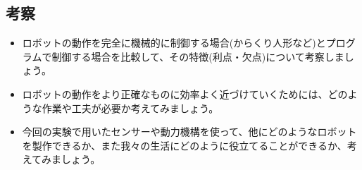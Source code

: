 \newpage

\subsection*{考察}

\begin{itemize}

\item ロボットの動作を完全に機械的に制御する場合(からくり人形など)とプログラムで制御する場合を比較して、その特徴(利点・欠点)について考察しましょう。

\vspace{6cm}

\item ロボットの動作をより正確なものに効率よく近づけていくためには、どのような作業や工夫が必要か考えてみましょう。

\vspace{6cm}

\item 今回の実験で用いたセンサーや動力機構を使って、他にどのようなロボットを製作できるか、また我々の生活にどのように役立てることができるか、考えてみましょう。

\end{itemize}

